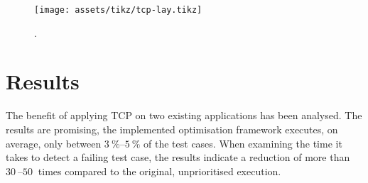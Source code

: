 \begin{figure}[t!]
	\centering
	\texttt{[image: assets/tikz/tcp-lay.tikz]}
	\caption{\tcp{}.}
	\label{fig:tcp-lay}
\end{figure}

\section*{Results}
The benefit of applying TCP on two existing applications has been analysed. The results are promising, the implemented optimisation framework executes, on average, only between $\SIrange{3}{5}{\percent}$ of the test cases. When examining the time it takes to detect a failing test case, the results indicate a reduction of more than $\SIrange{30}{50}{}$ times compared to the original, unprioritised execution.